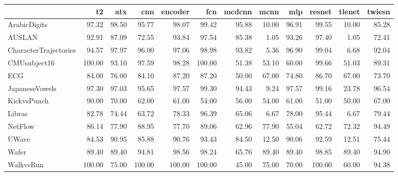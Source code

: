 \begin{tabular}{lrrrrrrrrrrr}
\hline
                       &     t2 &   atx &    cnn &   encoder &    fcn &   mcdcnn &   mcnn &   mlp &   resnet &   tlenet &   twiesn \\
\hline
 ArabicDigits          &  97.32 & 98.50 &  95.77 &     98.07 &  99.42 &    95.88 &  10.00 & 96.91 &    99.55 &    10.00 &    85.28 \\
 AUSLAN                &  92.91 & 87.09 &  72.55 &     93.84 &  97.54 &    85.38 &   1.05 & 93.26 &    97.40 &     1.05 &    72.41 \\
 CharacterTrajectories &  94.57 & 97.97 &  96.00 &     97.06 &  98.98 &    93.82 &   5.36 & 96.90 &    99.04 &     6.68 &    92.04 \\
 CMUsubject16          & 100.00 & 93.10 &  97.59 &     98.28 & 100.00 &    51.38 &  53.10 & 60.00 &    99.66 &    51.03 &    89.31 \\
 ECG                   &  84.00 & 76.00 &  84.10 &     87.20 &  87.20 &    50.00 &  67.00 & 74.80 &    86.70 &    67.00 &    73.70 \\
 JapaneseVowels        &  97.30 & 97.03 &  95.65 &     97.57 &  99.30 &    94.43 &   9.24 & 97.57 &    99.16 &    23.78 &    96.54 \\
 KickvsPunch           &  90.00 & 70.00 &  62.00 &     61.00 &  54.00 &    56.00 &  54.00 & 61.00 &    51.00 &    50.00 &    67.00 \\
 Libras                &  82.78 & 74.44 &  63.72 &     78.33 &  96.39 &    65.06 &   6.67 & 78.00 &    95.44 &     6.67 &    79.44 \\
 NetFlow               &  86.14 & 77.90 &  88.95 &     77.70 &  89.06 &    62.96 &  77.90 & 55.04 &    62.72 &    72.32 &    94.49 \\
 UWave                 &  84.53 & 90.95 &  85.88 &     90.76 &  93.43 &    84.50 &  12.50 & 90.06 &    92.59 &    12.51 &    75.44 \\
 Wafer                 &  89.40 & 89.40 &  94.81 &     98.56 &  98.24 &    65.76 &  89.40 & 89.40 &    98.85 &    89.40 &    94.90 \\
 WalkvsRun             & 100.00 & 75.00 & 100.00 &    100.00 & 100.00 &    45.00 &  75.00 & 70.00 &   100.00 &    60.00 &    94.38 \\
\hline
\end{tabular}
